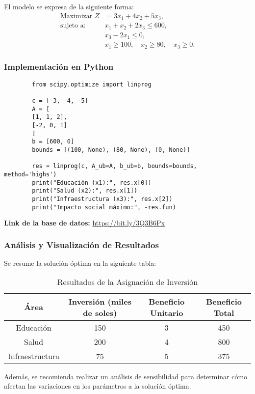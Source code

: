 	El modelo se expresa de la siguiente forma:
	\[
	\begin{aligned}
		\text{Maximizar } Z &= 3x_1 + 4x_2 + 5x_3,\\[1mm]
		\text{sujeto a: } \quad & x_1 + x_2 + 2x_3 \leq 600,\\[1mm]
		& x_3 - 2x_1 \leq 0,\\[1mm]
		& x_1 \geq 100,\quad x_2 \geq 80,\quad x_3 \geq 0.
	\end{aligned}
	\]
	
	\subsubsection{Implementación en Python}
	\begin{verbatim}
		from scipy.optimize import linprog
		
		c = [-3, -4, -5]
		A = [
		[1, 1, 2],
		[-2, 0, 1]
		]
		b = [600, 0]
		bounds = [(100, None), (80, None), (0, None)]
		
		res = linprog(c, A_ub=A, b_ub=b, bounds=bounds, method='highs')
		print("Educación (x1):", res.x[0])
		print("Salud (x2):", res.x[1])
		print("Infraestructura (x3):", res.x[2])
		print("Impacto social máximo:", -res.fun)
	\end{verbatim}
	
	\textbf{Link de la base de datos:} \url{https://bit.ly/3Q3B6Px}
	
	\subsubsection{Análisis y Visualización de Resultados}
	Se resume la solución óptima en la siguiente tabla:
	
	\begin{table}[H]
		\centering
		\caption{Resultados de la Asignación de Inversión}
		\begin{tabular}{cccc}
			\toprule
			\textbf{Área} & \textbf{Inversión (miles de soles)} & \textbf{Beneficio Unitario} & \textbf{Beneficio Total} \\
			\midrule
			Educación & 150 & 3 & 450 \\
			Salud     & 200 & 4 & 800 \\
			Infraestructura & 75 & 5 & 375 \\
			\bottomrule
		\end{tabular}
	\end{table}
	
	Además, se recomienda realizar un análisis de sensibilidad para determinar cómo afectan las variaciones en los parámetros a la solución óptima.
	
